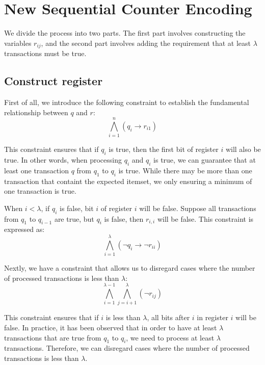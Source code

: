 \section{New Sequential Counter Encoding}

We divide the process into two parts. The first part involves constructing the variables $r_{ij}$,
and the second part involves adding the requirement that at least $\lambda$ transactions must be true.
\subsection{Construct register}

First of all, we introduce the following constraint to establish the fundamental relationship between $q$ and $r$:
\begin{equation}
    \label{eq:at_least_one_bit_true_when_q_i_true}
    \bigwedge_{i=1}^{n} \left( q_i \rightarrow r_{i1} \right)
\end{equation}

This constraint ensures that if $q_i$ is true, then the first bit of register $i$ will also be true. In other words, when processing $q_i$ and $q_i$ is true,
we can guarantee that at least one transaction $q$ from $q_1$ to $q_i$ is true.
While there may be more than one transaction that containt the expected itemset, we only ensuring a minimum of one transaction is true.

When $i < \lambda$, if $q_i$ is false, bit $i$ of register $i$ will be false.
Suppose all transactions from $q_1$ to $q_{i-1}$ are true, but $q_i$ is false, then $r_{i,i}$ will be false.
This constraint is expressed as:
\begin{equation}
    \label{eq:bit_i_of_register_i_false_when_q_i_false}
    \bigwedge_{i=1}^{\lambda} \left( \neg q_i \rightarrow \neg r_{ii} \right)
\end{equation}


Nextly, we have a constraint that allows us to disregard cases where the number of processed transactions is less than $\lambda$:
\begin{equation}
    \label{eq:disregard_when_i_less_than_lambda}
    \bigwedge_{i=1}^{\lambda-1} \bigwedge_{j=i+1}^{\lambda} \left( \neg r_{ij} \right)
\end{equation}

This constraint ensures that if $i$ is less than $\lambda$, all bits after $i$ in register $i$ will be false.
In practice, it has been observed that in order to have at least $\lambda$ transactions that are true from $q_1$ to $q_i$,
we need to process at least $\lambda$ transactions.
Therefore, we can disregard cases where the number of processed transactions is less than $\lambda$.

